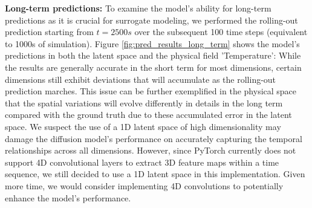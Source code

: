 \documentclass[final-report]{article-template}
\begin{document}
\textbf{Long-term predictions:} To examine the model's ability for long-term predictions as it is crucial for surrogate modeling, we performed the rolling-out prediction starting from $t = 2500s$ over the subsequent 100 time steps (equivalent to 1000s of simulation). Figure \ref{fig:pred_results_long_term} shows the model's predictions in both the latent space and the physical field 'Temperature': While the results are generally accurate in the short term for most dimensions, certain dimensions still exhibit deviations that will accumulate as the rolling-out prediction marches. This issue can be further exemplified in the physical space that the spatial variations will evolve differently in details in the long term compared with the ground truth due to these accumulated error in the latent space. We suspect the use of a 1D latent space of high dimensionality may damage the diffusion model's performance on accurately capturing the temporal relationships across all dimensions. However, since PyTorch currently does not support 4D convolutional layers to extract 3D feature maps within a time sequence, we still decided to use a 1D latent space in this implementation. Given more time, we would consider implementing 4D convolutions to potentially enhance the model's performance.
\end{document}
